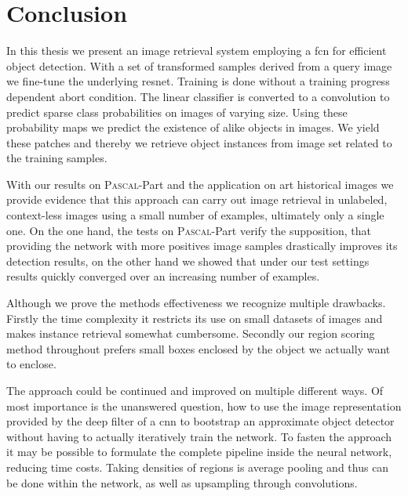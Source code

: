 %
\chapter{Conclusion}
\label{sec:conclusion}
In this thesis we present an image retrieval system employing a \acrlong{fcn} for efficient object detection. With a set of transformed samples derived from a query image we fine-tune the underlying \gls{resnet}. Training is done without a training progress dependent abort condition. The linear classifier is converted to a convolution to predict sparse class probabilities on images of varying size. Using these probability maps we predict the existence of alike objects in images. We yield these patches and thereby we retrieve object instances from image set related to the training samples.

With our results on \textsc{Pascal}-Part and the application on art historical images we provide evidence that this approach can carry out image retrieval in unlabeled, context-less images using a small number of examples, ultimately only a single one. On the one hand, the tests on \textsc{Pascal}-Part verify the supposition, that providing the network with more positives image samples drastically improves its detection results, on the other hand we showed that under our test settings results quickly converged over an increasing number of examples.

Although we prove the methods effectiveness we recognize multiple drawbacks. Firstly the time complexity  it restricts its use on small datasets of images and makes instance retrieval somewhat cumbersome. Secondly our region scoring method throughout prefers small boxes enclosed by the object we actually want to enclose.

The approach could be continued and improved on multiple different ways. Of most importance is the unanswered question, how to use the image representation provided by the deep filter of a \gls{cnn} to bootstrap an approximate object detector without having to actually iteratively train the network. To fasten the approach it may be possible to formulate the complete pipeline inside the neural network, reducing time costs. Taking densities of regions is average pooling and thus can be done within the network, as well as upsampling through convolutions.

